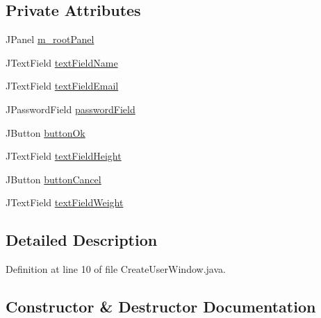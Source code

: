 \subsection*{Private Attributes}
\begin{DoxyCompactItemize}
\item 
J\+Panel \hyperlink{classcom_1_1activitytracker_1_1_create_user_window_a5a678326afe519b6a2c9e7a2d9eff87c}{m\+\_\+root\+Panel}
\item 
J\+Text\+Field \hyperlink{classcom_1_1activitytracker_1_1_create_user_window_aa2b8cf1781a8a1534dbf5c5b98332c05}{text\+Field\+Name}
\item 
J\+Text\+Field \hyperlink{classcom_1_1activitytracker_1_1_create_user_window_a4f6010631cb7be5a2ae3691bdca31483}{text\+Field\+Email}
\item 
J\+Password\+Field \hyperlink{classcom_1_1activitytracker_1_1_create_user_window_a29be9c267c003ae90731199d8257dc0a}{password\+Field}
\item 
J\+Button \hyperlink{classcom_1_1activitytracker_1_1_create_user_window_aa22864c8baa65b46fe9a7621748d7841}{button\+Ok}
\item 
J\+Text\+Field \hyperlink{classcom_1_1activitytracker_1_1_create_user_window_ac5ce2bc2efbc06d578d93fb3f26aad1c}{text\+Field\+Height}
\item 
J\+Button \hyperlink{classcom_1_1activitytracker_1_1_create_user_window_a975a5cc35d145a3efa4d9e340776ca63}{button\+Cancel}
\item 
J\+Text\+Field \hyperlink{classcom_1_1activitytracker_1_1_create_user_window_ae84b4d977150419bfabc11fbd009392c}{text\+Field\+Weight}
\end{DoxyCompactItemize}


\subsection{Detailed Description}


Definition at line 10 of file Create\+User\+Window.\+java.



\subsection{Constructor \& Destructor Documentation}
